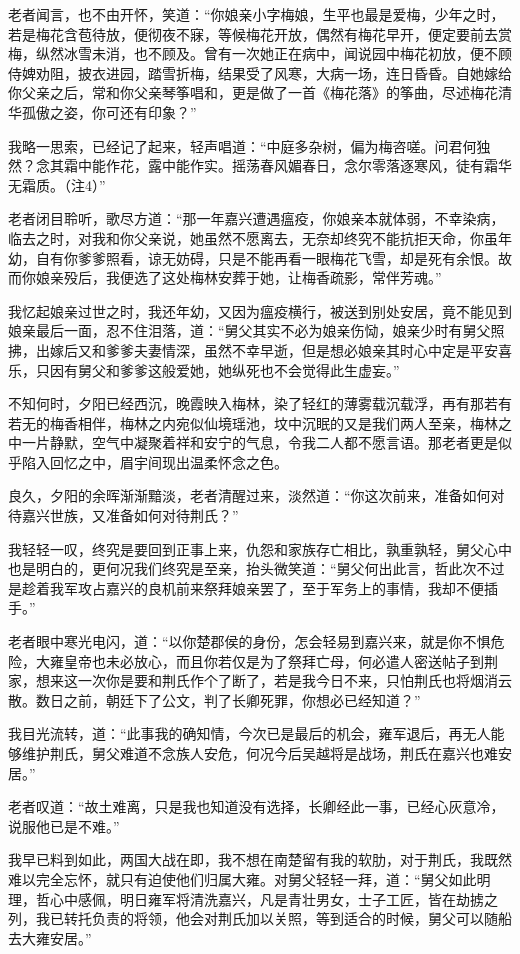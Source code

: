 老者闻言，也不由开怀，笑道：“你娘亲小字梅娘，生平也最是爱梅，少年之时，若是梅花含苞待放，便彻夜不寐，等候梅花开放，偶然有梅花早开，便定要前去赏梅，纵然冰雪未消，也不顾及。曾有一次她正在病中，闻说园中梅花初放，便不顾侍婢劝阻，披衣进园，踏雪折梅，结果受了风寒，大病一场，连日昏昏。自她嫁给你父亲之后，常和你父亲琴筝唱和，更是做了一首《梅花落》的筝曲，尽述梅花清华孤傲之姿，你可还有印象？”

我略一思索，已经记了起来，轻声唱道：“中庭多杂树，偏为梅咨嗟。问君何独然？念其霜中能作花，露中能作实。摇荡春风媚春日，念尔零落逐寒风，徒有霜华无霜质。（注4）”

老者闭目聆听，歌尽方道：“那一年嘉兴遭遇瘟疫，你娘亲本就体弱，不幸染病，临去之时，对我和你父亲说，她虽然不愿离去，无奈却终究不能抗拒天命，你虽年幼，自有你爹爹照看，谅无妨碍，只是不能再看一眼梅花飞雪，却是死有余恨。故而你娘亲殁后，我便选了这处梅林安葬于她，让梅香疏影，常伴芳魂。”

我忆起娘亲过世之时，我还年幼，又因为瘟疫横行，被送到别处安居，竟不能见到娘亲最后一面，忍不住泪落，道：“舅父其实不必为娘亲伤恸，娘亲少时有舅父照拂，出嫁后又和爹爹夫妻情深，虽然不幸早逝，但是想必娘亲其时心中定是平安喜乐，只因有舅父和爹爹这般爱她，她纵死也不会觉得此生虚妄。”

不知何时，夕阳已经西沉，晚霞映入梅林，染了轻红的薄雾载沉载浮，再有那若有若无的梅香相伴，梅林之内宛似仙境瑶池，坟中沉眠的又是我们两人至亲，梅林之中一片静默，空气中凝聚着祥和安宁的气息，令我二人都不愿言语。那老者更是似乎陷入回忆之中，眉宇间现出温柔怀念之色。

良久，夕阳的余晖渐渐黯淡，老者清醒过来，淡然道：“你这次前来，准备如何对待嘉兴世族，又准备如何对待荆氏？”

我轻轻一叹，终究是要回到正事上来，仇怨和家族存亡相比，孰重孰轻，舅父心中也是明白的，更何况我们终究是至亲，抬头微笑道：“舅父何出此言，哲此次不过是趁着我军攻占嘉兴的良机前来祭拜娘亲罢了，至于军务上的事情，我却不便插手。”

老者眼中寒光电闪，道：“以你楚郡侯的身份，怎会轻易到嘉兴来，就是你不惧危险，大雍皇帝也未必放心，而且你若仅是为了祭拜亡母，何必遣人密送帖子到荆家，想来这一次你是要和荆氏作个了断了，若是我今日不来，只怕荆氏也将烟消云散。数日之前，朝廷下了公文，判了长卿死罪，你想必已经知道？”

我目光流转，道：“此事我的确知情，今次已是最后的机会，雍军退后，再无人能够维护荆氏，舅父难道不念族人安危，何况今后吴越将是战场，荆氏在嘉兴也难安居。”

老者叹道：“故土难离，只是我也知道没有选择，长卿经此一事，已经心灰意冷，说服他已是不难。”

我早已料到如此，两国大战在即，我不想在南楚留有我的软肋，对于荆氏，我既然难以完全忘怀，就只有迫使他们归属大雍。对舅父轻轻一拜，道：“舅父如此明理，哲心中感佩，明日雍军将清洗嘉兴，凡是青壮男女，士子工匠，皆在劫掳之列，我已转托负责的将领，他会对荆氏加以关照，等到适合的时候，舅父可以随船去大雍安居。”

